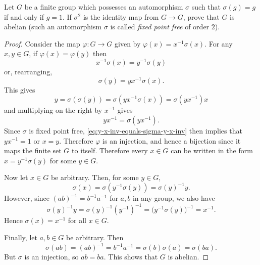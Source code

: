  Let $G$ be a finite group which possesses an
automorphism $\sigma$ such that $\sigma(g) = g$ if and only if
$g = 1$. If $\sigma^2$ is the identity map from $G\to G$, prove that
$G$ is abelian (such an automorphism $\sigma$ is called {\em fixed
  point free} of order $2$).
\begin{proof}
  Consider the map $\varphi\colon G\to G$ given by
  $\varphi(x) = x^{-1}\sigma(x)$. For any $x,y\in G$, if
  $\varphi(x) = \varphi(y)$ then
  \begin{equation*}
    x^{-1}\sigma(x) = y^{-1}\sigma(y)
  \end{equation*}
  or, rearranging,
  \begin{equation*}
    \sigma(y) = yx^{-1}\sigma(x).
  \end{equation*}
  This gives
  \begin{equation*}
    y = \sigma(\sigma(y)) = \sigma(yx^{-1}\sigma(x))
    = \sigma(yx^{-1})x
  \end{equation*}
  and multiplying on the right by $x^{-1}$ gives
  \begin{equation}
    \label{eq:y-x-inv-equals-sigma-y-x-inv}
    yx^{-1} = \sigma(yx^{-1}).
  \end{equation}
  Since $\sigma$ is fixed point free,
  \eqref{eq:y-x-inv-equals-sigma-y-x-inv} then implies that
  $yx^{-1} = 1$ or $x = y$. Therefore $\varphi$ is an injection, and
  hence a bijection since it maps the finite set $G$ to
  itself. Therefore every $x\in G$ can be written in the form
  $x = y^{-1}\sigma(y)$ for some $y\in G$.

  Now let $x\in G$ be arbitrary. Then, for some $y\in G$,
  \begin{equation*}
    \sigma(x) = \sigma(y^{-1}\sigma(y)) = \sigma(y)^{-1}y.
  \end{equation*}
  However, since $(ab)^{-1} = b^{-1}a^{-1}$ for $a,b$ in any group, we
  also have
  \begin{equation*}
    \sigma(y)^{-1}y = \sigma(y)^{-1}(y^{-1})^{-1}
    = \big(y^{-1}\sigma(y)\big)^{-1} = x^{-1}.
  \end{equation*}
  Hence $\sigma(x) = x^{-1}$ for all $x\in G$.

  Finally, let $a,b\in G$ be arbitrary. Then
  \begin{equation*}
    \sigma(ab) = (ab)^{-1} = b^{-1}a^{-1} = \sigma(b)\sigma(a) = \sigma(ba).
  \end{equation*}
  But $\sigma$ is an injection, so $ab = ba$. This shows that $G$ is
  abelian.
\end{proof}
